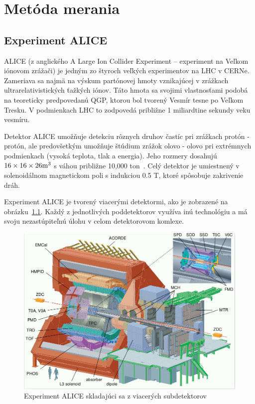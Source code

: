 \documentclass[thesismargins, thesislinespacing]{rnthesis}
\begin{document}
\chapter{Metóda merania}

\section{Experiment ALICE}

ALICE (z anglického A Large Ion Collider Experiment – experiment na Veľkom iónovom zrážači) je jedným zo štyroch veľkých experimentov na LHC v CERNe. Zameriava sa najmä na výskum partónovej hmoty vznikajúcej v zrážkach ultrarelativistických ťažkých iónov. Táto hmota sa svojimi vlastnosťami podobá na teoreticky predpovedanú QGP, ktorou bol tvorený Vesmír tesne po Veľkom Tresku. V podmienkach LHC to zodpovedá približne 1 miliardtine sekundy veku vesmíru.



Detektor  ALICE umožňuje detekciu rôznych druhov častíc pri zrážkach protón - protón, ale predovšetkým umožňuje štúdium zrážok olovo - olovo pri extrémnych podmienkach (vysoká teplota, tlak a energia). Jeho rozmery dosahujú $16\times 16\times26 \rm{m^3}$ s váhou približne 10,000 ton~\cite{alice}. Celý detektor je umiestnený v solenoidálnom magnetickom poli s indukciou 0.5 T, ktoré spôsobuje zakrivenie dráh.

Experiment ALICE je tvorený viacerými detektormi, ako je zobrazené na obrázku~\ref{ALICE}. Každý z jednotlivých poddetektorov využíva inú technológiu a má svoju nezastúpiteľnú úlohu v celom detektorovom komlexe.
\newpage

\begin{figure}[hbtp!]
	\begin{center}
		\includegraphics[width=\textwidth]{./Obrazky_praca/ALICE.png}
		\caption{Experiment ALICE skladajúci sa z viacerých subdetektorov~\cite{aliceDetektor}}
		\label{ALICE}
	\end{center}
\end{figure}
\end{document}
